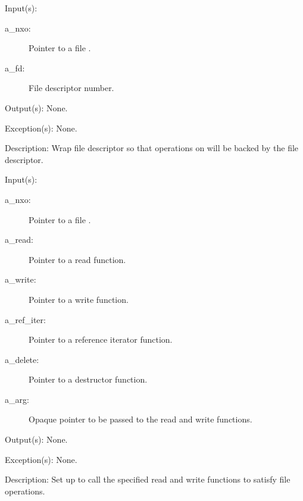 \begin{capi}
	\begin{capilist}
	\item[Input(s): ]
		\begin{description}\item[]
		\item[a\_nxo: ]
			Pointer to a file .
		\item[a\_fd: ]
			File descriptor number.
		\end{description}
	\item[Output(s): ] None.
	\item[Exception(s): ] None.
	\item[Description: ]
		Wrap file descriptor  so that operations on
		 will be backed by the file descriptor.
	\end{capilist}
\label{nxo_file_synthetic}
	\begin{capilist}
	\item[Input(s): ]
		\begin{description}\item[]
		\item[a\_nxo: ]
			Pointer to a file \classname{nxo}.
		\item[a\_read: ]
			Pointer to a read function.
		\item[a\_write: ]
			Pointer to a write function.
		\item[a\_ref\_iter: ]
			Pointer to a reference iterator function.
		\item[a\_delete: ]
			Pointer to a destructor function.
		\item[a\_arg: ]
			Opaque pointer to be passed to the read and write
			functions.
		\end{description}
	\item[Output(s): ] None.
	\item[Exception(s): ] None.
	\item[Description: ]
		Set up  to call the specified read and write
		functions to satisfy file operations.
	\end{capilist}
\label{nxo_file_open}
\end{capi}
